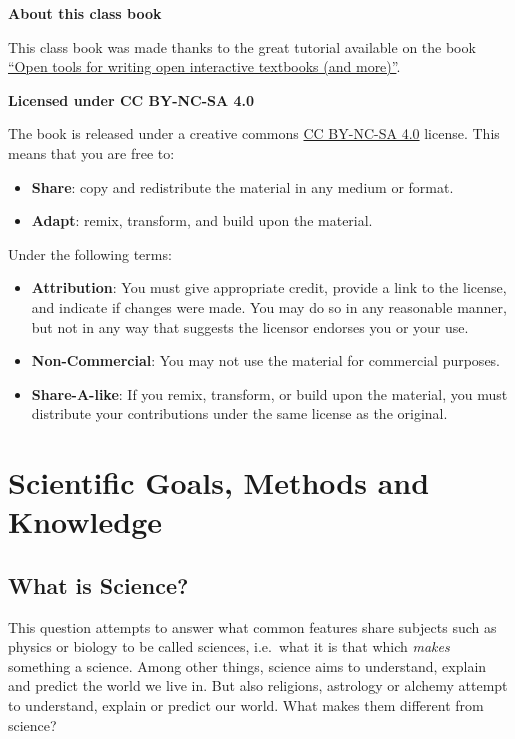 \documentclass[
]{book}
\providecommand{\tightlist}{%
  \setlength{\itemsep}{0pt}\setlength{\parskip}{0pt}}
\begin{document}
\textbf{About this class book}

This class book was made thanks to the great tutorial available on the book \href{https://www.crumplab.com/OER_bookdown}{``Open tools for writing open interactive textbooks (and more)''}.

\textbf{Licensed under CC BY-NC-SA 4.0}

The book is released under a creative commons \href{https://creativecommons.org/licenses/by-nc-sa/4.0/}{CC BY-NC-SA 4.0} license. This means that you are free to:

\begin{itemize}
\tightlist
\item
  \textbf{Share}: copy and redistribute the material in any medium or format.
\item
  \textbf{Adapt}: remix, transform, and build upon the material.
\end{itemize}

Under the following terms:

\begin{itemize}
\tightlist
\item
  \textbf{Attribution}: You must give appropriate credit, provide a link to the license, and indicate if changes were made. You may do so in any reasonable manner, but not in any way that suggests the licensor endorses you or your use.
\item
  \textbf{Non-Commercial}: You may not use the material for commercial purposes.
\item
  \textbf{Share-A-like}: If you remix, transform, or build upon the material, you must distribute your contributions under the same license as the original.
\end{itemize}

\hypertarget{scientific-goals-methods-and-knowledge}{%
\chapter{Scientific Goals, Methods and Knowledge}\label{scientific-goals-methods-and-knowledge}}

\hypertarget{what-is-science}{%
\section{What is Science?}\label{what-is-science}}

This question attempts to answer what common features share subjects such as physics or biology to be called sciences, i.e.~what it is that which \emph{makes} something a science. Among other things, science aims to understand, explain and predict the world we live in. But also religions, astrology or alchemy attempt to understand, explain or predict our world. What makes them different from science?
\end{document}
